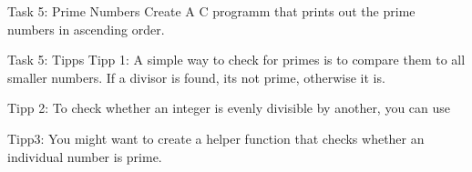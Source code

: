 \documentclass[10pt,graphics,aspectratio=169,table]{beamer}
\begin{document}
\begin{frame}[fragile]{Task 5: Prime Numbers}
Create A C programm that prints out the prime numbers in ascending order.
\end{frame}

\begin{frame}[fragile]{Task 5: Tipps}
Tipp 1: 
A simple way to check for primes is to compare them to all smaller numbers.
If a divisor is found, its not prime, otherwise it is. 

Tipp 2:
To check whether an integer is evenly divisible by another, you can use

Tipp3: You might want to create a helper function  that checks 
whether an individual number is prime.
\end{frame}
\end{document}
